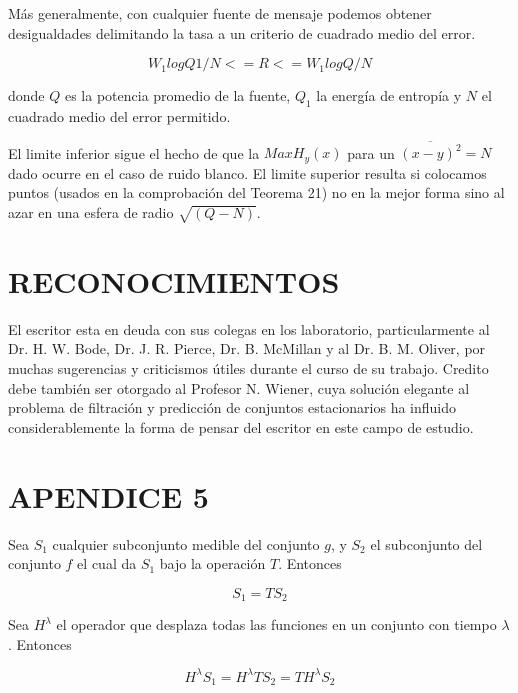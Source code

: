 M\'as generalmente, con cualquier fuente de mensaje podemos obtener desigualdades delimitando
la tasa a un criterio de cuadrado medio del error.

\newtheorem{Teorema 23}{Teorema 23: La tasa para cualquier fuente de banda $W_{1}$ es delimitada por:}

		\begin{equation} W_{1} log Q1/N <= R <= W_{1} log Q/N \end{equation}
		
donde $Q$ es la potencia promedio de la fuente, $Q_{1}$ la energ\'ia de entrop\'ia y $N$ el
cuadrado medio del error permitido.

El limite inferior sigue el hecho de que la $MaxH_{y}(x)$ para un $\overline{(x - y)^{2}} = N$ 
dado ocurre en el caso de ruido blanco. El limite superior resulta si colocamos puntos (usados en 
la comprobaci\'on del Teorema 21) no en la mejor forma sino al azar en una esfera de radio
$\sqrt{(Q - N)}$.


\section{RECONOCIMIENTOS}

El escritor esta en deuda con sus colegas en los laboratorio, particularmente al 
Dr. H. W. Bode, Dr. J. R. Pierce, Dr. B. McMillan y al Dr. B. M. Oliver, por muchas 
sugerencias y criticismos \'utiles durante el curso de su trabajo. Credito debe tambi\'en
ser otorgado al Profesor N. Wiener, cuya soluci\'on elegante al problema de filtraci\'on
y predicci\'on de conjuntos estacionarios ha influido considerablemente la forma de pensar
del escritor en este campo de estudio.

\section{APENDICE 5}

Sea $S_{1}$ cualquier subconjunto medible del conjunto $g$, y $S_{2}$ el subconjunto del 
conjunto $f$ el cual da $S_{1}$ bajo la operaci\'on $T$. Entonces
				
\begin{equation} S_{1} = TS_{2} \end{equation}

Sea $H^{\lambda}$ el operador que desplaza todas las funciones en  un conjunto con tiempo
$\lambda$. Entonces

\begin{equation} H^{\lambda} S_{1} = H^{\lambda} T S_{2} = T H^{\lambda} S_{2} \end{equation}
					

